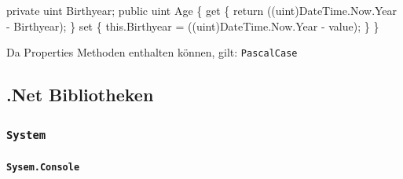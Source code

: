 \documentclass[
  9pt,
  a4paperpaper,
  DIV=11]{scrartcl}
\let\oldparagraph\paragraph
\renewcommand{\paragraph}[1]{\oldparagraph{#1}\mbox{}}
\newenvironment{Shaded}{}{}
\newcommand{\DataTypeTok}[1]{\textcolor[rgb]{0.84,0.23,0.29}{#1}}
\newcommand{\FunctionTok}[1]{\textcolor[rgb]{0.44,0.26,0.76}{#1}}
\newcommand{\KeywordTok}[1]{\textcolor[rgb]{0.84,0.23,0.29}{#1}}
\newcommand{\NormalTok}[1]{\textcolor[rgb]{0.14,0.16,0.18}{#1}}
\newcommand{\OperatorTok}[1]{\textcolor[rgb]{0.14,0.16,0.18}{#1}}
\numberwithin{equation}{section}
\begin{document}
\begin{multicols}{2}
\begin{Shaded}
\begin{Highlighting}[]
\KeywordTok{private} \DataTypeTok{uint}\NormalTok{ Birthyear}\OperatorTok{;}
\KeywordTok{public} \DataTypeTok{uint}\NormalTok{ Age }\OperatorTok{\{}
  \KeywordTok{get} \OperatorTok{\{} 
    \KeywordTok{return} \OperatorTok{((}\DataTypeTok{uint}\OperatorTok{)}\NormalTok{DateTime}\OperatorTok{.}\FunctionTok{Now}\OperatorTok{.}\FunctionTok{Year} \OperatorTok{{-}}\NormalTok{ Birthyear}\OperatorTok{);} 
    \OperatorTok{\}}
  \KeywordTok{set} \OperatorTok{\{} 
    \KeywordTok{this}\OperatorTok{.}\FunctionTok{Birthyear} \OperatorTok{=} \OperatorTok{((}\DataTypeTok{uint}\OperatorTok{)}\NormalTok{DateTime}\OperatorTok{.}\FunctionTok{Now}\OperatorTok{.}\FunctionTok{Year} \OperatorTok{{-}}\NormalTok{ value}\OperatorTok{);} 
    \OperatorTok{\}}
\OperatorTok{\}}
\end{Highlighting}
\end{Shaded}

\begin{tcolorbox}[enhanced jigsaw, colback=white, toptitle=1mm, coltitle=black, left=2mm, opacityback=0, leftrule=.75mm, colbacktitle=quarto-callout-important-color!10!white, title=\textcolor{quarto-callout-important-color}{\faExclamation}\hspace{0.5em}{Namensgebung}, breakable, bottomrule=.15mm, bottomtitle=1mm, titlerule=0mm, toprule=.15mm, rightrule=.15mm, colframe=quarto-callout-important-color-frame, arc=.35mm, opacitybacktitle=0.6]

Da Properties Methoden enthalten können, gilt: \texttt{PascalCase}

\end{tcolorbox}

\hypertarget{net-bibliotheken}{%
\subsection{.Net Bibliotheken}\label{net-bibliotheken}}

\hypertarget{system}{%
\subsubsection{\texorpdfstring{\texttt{System}}{System}}\label{system}}

\hypertarget{sysem.console}{%
\paragraph{\texorpdfstring{\texttt{Sysem.Console}}{Sysem.Console}}\label{sysem.console}}


\end{multicols}
\end{document}
